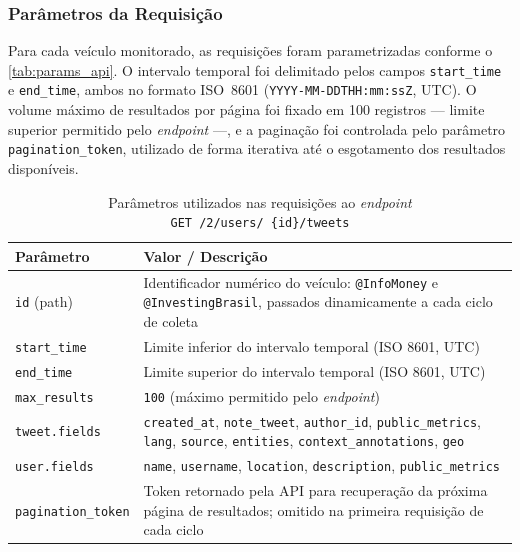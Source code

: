 \subsubsection{Parâmetros da Requisição}
\label{subsubsec:parametros_api}

Para cada veículo monitorado, as requisições foram parametrizadas conforme o \autoref{tab:params_api}. O intervalo temporal foi delimitado pelos campos \texttt{start\_time} e \texttt{end\_time}, ambos no formato ISO~8601 (\texttt{YYYY-MM-DDTHH:mm:ssZ}, UTC). O volume máximo de resultados por página foi fixado em 100 registros — limite superior permitido pelo \textit{endpoint} —, e a paginação foi controlada pelo parâmetro \texttt{pagination\_token}, utilizado de forma iterativa até o esgotamento dos resultados disponíveis.

\begin{table}[htb]
	\caption{Parâmetros utilizados nas requisições ao \textit{endpoint} \\ \texttt{GET /2/users/ \{id\}/tweets}}
	\label{tab:params_api}
	
	\begin{tabular}{p{4cm}p{10.5cm}}
		\hline
		\textbf{Parâmetro} & \textbf{Valor / Descrição} \\
		\hline
		\texttt{id} (path) & Identificador numérico do veículo: \texttt{@InfoMoney} e \texttt{@InvestingBrasil}, passados dinamicamente a cada ciclo de coleta \\
		\hline
		\texttt{start\_time} & Limite inferior do intervalo temporal (ISO 8601, UTC) \\
		\hline
		\texttt{end\_time} & Limite superior do intervalo temporal (ISO 8601, UTC) \\
		\hline
		\texttt{max\_results} & \texttt{100} (máximo permitido pelo \textit{endpoint}) \\
		\hline
		\texttt{tweet.fields} & \texttt{created\_at}, \texttt{note\_tweet}, \texttt{author\_id}, \texttt{public\_metrics}, \texttt{lang}, \texttt{source}, \texttt{entities}, \texttt{context\_annotations}, \texttt{geo} \\
		\hline
		\texttt{user.fields} & \texttt{name}, \texttt{username}, \texttt{location}, \texttt{description}, \texttt{public\_metrics} \\
		\hline
		\texttt{pagination\_token} & Token retornado pela API para recuperação da próxima página de resultados; omitido na primeira requisição de cada ciclo \\
		\hline
	\end{tabular}
\end{table}

